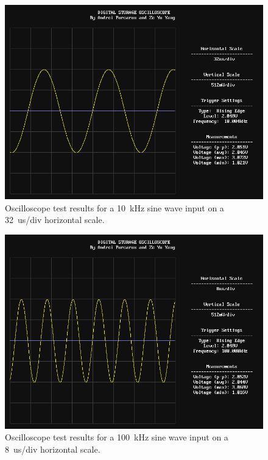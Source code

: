 \documentclass[journal,hidelinks]{IEEEtran}
\begin{document}
\begin{figure}[!htb]
  \centering
  \includegraphics[width=\columnwidth]{test-results/scope_demo_10kHz.png}
  \caption{Oscilloscope test results for a 10~kHz sine wave input on a 32~us/div horizontal scale.}
  \label{fig:scope_test_2}
\end{figure}

\begin{figure}[!htb]
  \centering
  \includegraphics[width=\columnwidth]{test-results/scope_demo_100kHz.png}
  \caption{Oscilloscope test results for a 100~kHz sine wave input on a 8~us/div horizontal scale.}
  \label{fig:scope_test_3}
\end{figure}
\end{document}
